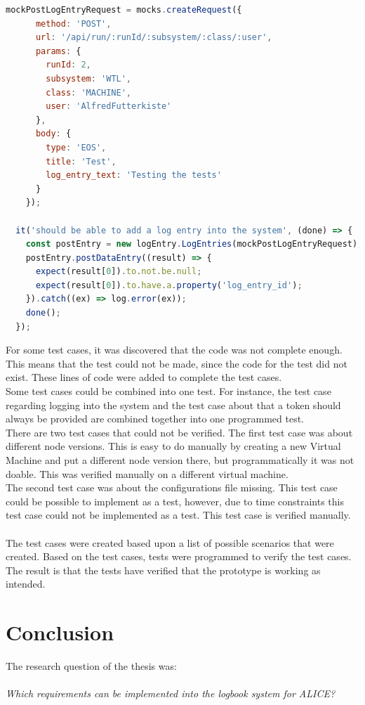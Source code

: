 \documentclass[paper=a4, fontsize=11pt,twoside]{scrartcl}	%
\begin{document}
\begin{lstlisting}[language=JavaScript, frame=single]
mockPostLogEntryRequest = mocks.createRequest({
      method: 'POST',
      url: '/api/run/:runId/:subsystem/:class/:user',
      params: {
        runId: 2,
        subsystem: 'WTL',
        class: 'MACHINE',
        user: 'AlfredFutterkiste'
      },
      body: {
        type: 'EOS',
        title: 'Test',
        log_entry_text: 'Testing the tests'
      }
    });
    
  it('should be able to add a log entry into the system', (done) => {
    const postEntry = new logEntry.LogEntries(mockPostLogEntryRequest);
    postEntry.postDataEntry((result) => {
      expect(result[0]).to.not.be.null;
      expect(result[0]).to.have.a.property('log_entry_id');
    }).catch((ex) => log.error(ex));
    done();
  });


\end{lstlisting}


For some test cases, it was discovered that the code was not complete enough. This means that the test could not be made, since the code for the test did not exist. These lines of code were added to complete the test cases. \\
Some test cases could be combined into one test. For instance, the test case regarding logging into the system and the test case about that a token should always be provided are combined together into one programmed test. \\
There are two test cases that could not be verified. The first test case was about different node versions. This is easy to do manually by creating a new Virtual Machine and put a different node version there, but programmatically it was not doable. This was verified manually on a different virtual machine. \\ 
The second test case was about the configurations file missing. This test case could be possible to implement as a test, however, due to time constraints this test case could not be implemented as a test. This test case is verified manually.\\ \\

The test cases were created based upon a list of possible scenarios that were created. Based on the test cases, tests were programmed to verify the test cases. The result is that the tests have verified that the prototype is working as intended. 

\newpage
\section{Conclusion}
The research question of the thesis was: \\ \\
\textit{Which requirements can be implemented into the logbook system for ALICE?} \\
\end{document}
